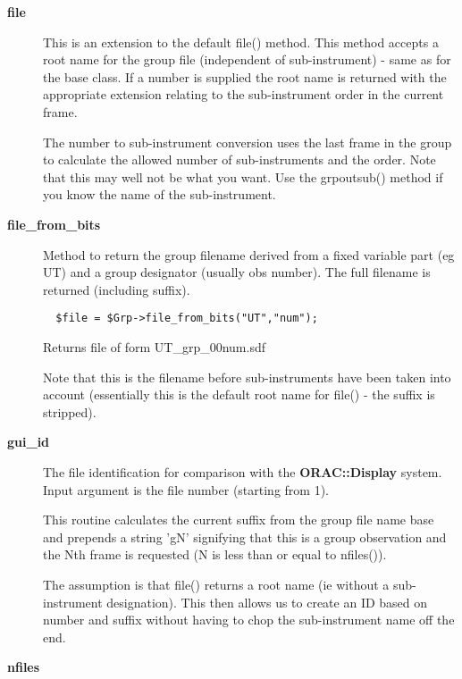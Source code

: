 \begin{description}
\begin{description}
\item[{\textbf{file}}] \mbox{}

This is an extension to the default file() method.
This method accepts a root name for the group file
(independent of sub-instrument) - same as for the base 
class. If a number is supplied the root name is returned
with the appropriate extension relating to the 
sub-instrument order in the current frame.



The number to sub-instrument conversion uses the last frame in the
group to calculate the allowed number of sub-instruments and
the order. Note that this may well not be what you want.
Use the grpoutsub() method if you know the name of the sub-instrument.


\item[{\textbf{file\_from\_bits}}] \mbox{}

Method to return the group filename derived from a fixed
variable part (eg UT) and a group designator (usually obs
number). The full filename is returned (including suffix).

\begin{verbatim}
  $file = $Grp->file_from_bits("UT","num");
\end{verbatim}


Returns file of form UT\_grp\_00num.sdf



Note that this is the filename before sub-instruments
have been taken into account (essentially this is the
default root name for file() - the suffix is stripped).


\item[{\textbf{gui\_id}}] \mbox{}

The file identification for comparison with the \textbf{ORAC::Display}
system. Input argument is the file number (starting from 1).



This routine calculates the current suffix from the group file
name base and prepends a string 'gN' signifying that this is
a group observation and the Nth frame is requested (N is less than
or equal to nfiles()).



The assumption is that file() returns a root name (ie without
a sub-instrument designation). This then allows us to create an
ID based on number and suffix without having to chop the
sub-instrument name off the end.


\item[{\textbf{nfiles}}] \mbox{}


\end{description}
\end{description}
